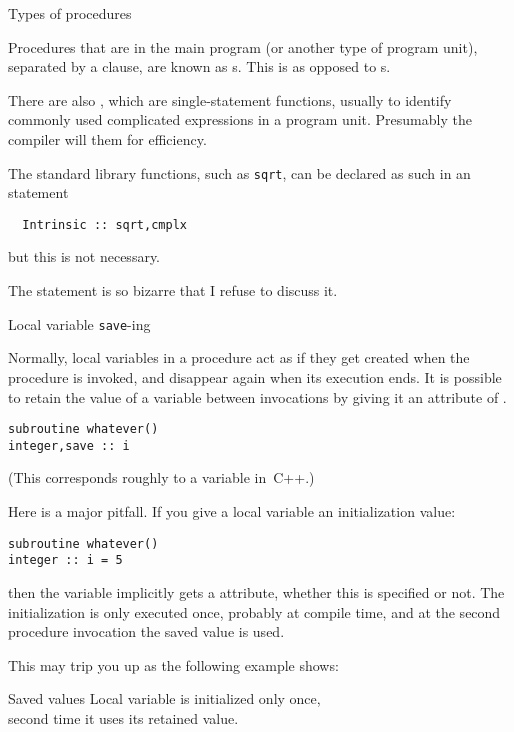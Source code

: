  {Types of procedures}

Procedures that are in the main program (or another type of program
unit), separated by a  clause, are known as
s. This is as opposed to
s.

There are also , which are
single-statement functions, usually to identify commonly used
complicated expressions in a program unit. Presumably the compiler
will  them for efficiency.

The standard library functions, such as \lstinline+sqrt+,
can be declared as such in an  statement
\begin{lstlisting}
  Intrinsic :: sqrt,cmplx
\end{lstlisting}
but this is not necessary.

The  statement is so bizarre that I refuse to discuss it.

 {Local variable \texttt{save}-ing}
\label{sec:f-save-var}

Normally, local variables in a procedure act as if they
get created when the procedure is invoked,
and disappear again when its execution ends.
It is possible to retain the value of a variable
between invocations by giving it an attribute of .
\begin{lstlisting}
subroutine whatever()
integer,save :: i
\end{lstlisting}
(This corresponds roughly to a  variable in~C++.)

Here is a major pitfall.
If you give a local variable an initialization value:
\begin{lstlisting}
subroutine whatever()
integer :: i = 5
\end{lstlisting}
then the variable implicitly gets a  attribute,
whether this is specified or not.
The initialization is only executed once,
probably at compile time,
and at the second procedure invocation
the saved value is used.

This may trip you up as the following example shows:

\begin{block}{Saved values}
  \label{sl:func-param-save}
  Local variable is initialized only once,\\
  second time it uses its retained value.
  
\end{block}


